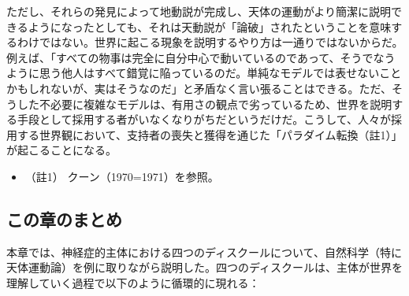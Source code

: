 ただし、それらの発見によって地動説が完成し、天体の運動がより簡潔に説明できるようになったとしても、それは天動説が「論破」されたということを意味するわけではない。世界に起こる現象を説明するやり方は一通りではないからだ。例えば、「すべての物事は完全に自分中心で動いているのであって、そうでなうように思う他人はすべて錯覚に陥っているのだ。単純なモデルでは表せないことかもしれないが、実はそうなのだ」と矛盾なく言い張ることはできる。ただ、そうした不必要に複雑なモデルは、有用さの観点で劣っているため、世界を説明する手段として採用する者がいなくなりがちだというだけだ。こうして、人々が採用する世界観において、支持者の喪失と獲得を通じた「パラダイム転換（註1）」が起こることになる。

\begin{itemize}
\tightlist
\item
  （註1） クーン（1970=1971）\cite{Khun}を参照。
\end{itemize}

\subsection{この章のまとめ}\label{ux3053ux306eux7ae0ux306eux307eux3068ux3081}

本章では、神経症的主体における四つのディスクールについて、自然科学（特に天体運動論）を例に取りながら説明した。四つのディスクールは、主体が世界を理解していく過程で以下のように循環的に現れる：

